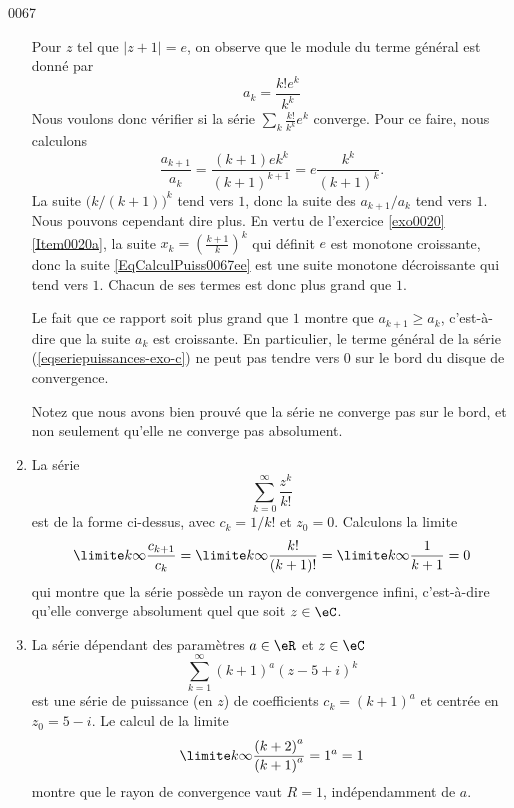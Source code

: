\begin{corrige}{0067}
\begin{enumerate}
Pour $z$ tel que $| z+1 | = e$, on observe que le module du terme général est donné par
\begin{equation}
a_k = \frac{k! e^k}{k^k}
\end{equation}
Nous voulons donc vérifier si la série $\sum_k\frac{ k! }{ k^k }e^k$ converge. Pour ce faire, nous calculons
\begin{equation}\label{EqCalculPuiss0067ee}
	\frac{a_{k+1}}{a_k}=\frac{ (k+1)ek^k }{ (k+1)^{k+1} }=e\frac{ k^k }{ (k+1)^k }.
\end{equation}
La suite $\big( k/(k+1) \big)^k$ tend vers $1$, donc la suite des $a_{k+1}/a_k$ tend vers $1$. Nous pouvons cependant dire plus. En vertu de l'exercice \ref{exo0020}\ref{Item0020a}, la suite $x_k=\left( \frac{ k+1 }{ k } \right)^k$ qui définit $e$ est monotone croissante, donc la suite \eqref{EqCalculPuiss0067ee} est une suite monotone décroissante qui tend vers $1$. Chacun de ses termes est donc plus grand que $1$.


Le fait que ce rapport soit plus grand que $1$ montre que $a_{k+1} \geq a_k$, c'est-à-dire que la suite $a_k$ est croissante. En particulier, le terme général de la série (\ref{eqseriepuissances-exo-c}) ne peut pas tendre vers $0$ sur le bord du disque de convergence.

Notez que nous avons bien prouvé que la série ne converge pas sur le bord, et non seulement qu'elle ne converge pas absolument.

\item 
La série
\begin{equation*}
	\sum_{k=0}^\infty \frac{z^k}{k!}
\end{equation*}
est de la forme ci-dessus, avec $c_k = 1/k!$ et $z_0 = 0$. Calculons la limite
\begin{equation*}
\limite k \infty \frac{c_{k+1}}{c_k} = \limite k\infty
\frac{k!}{(k+1)!} = \limite k\infty \frac{1}{k+1} = 0
\end{equation*}
qui montre que la série possède un rayon de convergence infini,
c'est-à-dire qu'elle converge absolument quel que soit $z \in \eC$.

\item La série dépendant des paramètres $a \in \eR$ et $z \in \eC$
\begin{equation*}
\sum_{k=1}^\infty {(k+1)}^a {(z- 5 + i)}^k
\end{equation*}
est une série de puissance (en $z$) de coefficients $c_k =
{(k+1)}^a$ et centrée en $z_0 = 5 - i$. Le calcul de la limite
\begin{equation*}
\limite k\infty \frac{{(k+2)}^a}{{(k+1)}^a} = 1^a = 1
\end{equation*}
montre que le rayon de convergence vaut $R = 1$, indépendamment de
$a$.


\end{enumerate}
\end{corrige}
